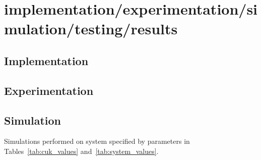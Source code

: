 \section{implementation/experimentation/simulation/testing/results}
\subsection{Implementation}
\subsection{Experimentation}
\subsection{Simulation}
Simulations performed on system specified by parameters in Tables~\ref{tab:cuk_values} and~\ref{tab:system_values}.
